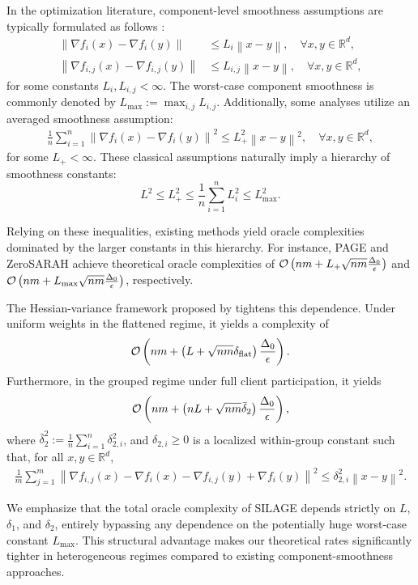 \documentclass{article}
\newcommand{\bb}{\mathbb}
\newcommand{\R}{\bb R}
\newcommand{\norm}[1]{\left\| #1 \right\|}
\newcommand{\sqn}[1]{\left\| #1 \right\|^2}
\newcommand{\cO}{{\cal O}}
\newcommand{\eqdef}{:=}
\newcommand{\rb}[1]{\left(#1\right)}
\theoremstyle{plain}
\newcommand{\algname}[1]{{\sf\scalefont{0.88}\color{mydarkgreen}#1}\xspace}
\def\algname#1{#1}%
\newcommand{\squeeze}{\textstyle}
\begin{document}
In the optimization literature, component-level smoothness assumptions are typically formulated as follows \citep{li21, PAGE-AB, li2021zerosarah, dasha23, zhao21}:
\begin{align}
    \squeeze
    \norm{\nabla f_i(x)-\nabla f_i(y)} &\leq L_i\norm{x-y}, \quad \forall x, y \in \R^d, \label{eq:smooth_i} \\
    \norm{\nabla f_{i,j}(x)-\nabla f_{i,j}(y)} &\leq L_{i,j}\norm{x-y}, \quad \forall x, y \in \R^d, \label{eq:smooth_ij}
\end{align}
for some constants $L_i, L_{i,j} < \infty$. The worst-case component smoothness is commonly denoted by $L_{\max} \eqdef \max_{i,j} L_{i,j}$. Additionally, some analyses utilize an averaged smoothness assumption:
\begin{align}
    \frac{1}{n} \sum_{i=1}^n\sqn{\nabla f_i(x)-\nabla f_i(y)} \leq L_{+}^2\sqn{x-y}, \quad \forall x, y \in \R^d,
    \label{eq:smooth_plus}
\end{align}
for some $L_{+} < \infty$. These classical assumptions naturally imply a hierarchy of smoothness constants: \[L^2 \le L_{+}^2 \leq \frac{1}{n} \sum_{i=1}^n L_i^2 \le L_{\max}^2.\]

Relying on these inequalities, existing methods yield oracle complexities dominated by the larger constants in this hierarchy. For instance, \algname{PAGE} \citep{li21} and \algname{ZeroSARAH} \citep{li2021zerosarah} achieve theoretical oracle complexities of $\cO\rb{nm + L_{+}\sqrt{nm}\frac{\Delta_0}{\epsilon}}$ and $\cO\rb{nm + L_{\max}\sqrt{nm}\frac{\Delta_0}{\epsilon}}$, respectively.

The Hessian-variance framework proposed by \citet{PAGE-AB} tightens this dependence. Under uniform weights in the flattened regime, it yields a complexity of \[\cO\rb{nm + \rb{L+\sqrt{nm}\delta_{\mathrm{flat}}}\frac{\Delta_0}{\epsilon}}.\] Furthermore, in the grouped regime under full client participation, it yields \[\cO\rb{nm+\rb{nL+\sqrt{nm}\bar\delta_2}\frac{\Delta_0}{\epsilon}},\] where $\bar\delta_2^2\eqdef \frac1n\sum_{i=1}^n\delta_{2,i}^2$, and $\delta_{2,i} \ge 0$ is a localized within-group constant such that, for all $x,y\in\R^d$,
\begin{align}
    \frac1m\sum_{j=1}^m
    \sqn{
    \nabla f_{i,j}(x)-\nabla f_i(x)
    -\nabla f_{i,j}(y)+\nabla f_i(y)}
    \leq
    \delta_{2,i}^2\sqn{x-y}.
    \label{eq:delta2i}
\end{align}

We emphasize that the total oracle complexity of \algname{SILAGE} depends strictly on $L$, $\delta_1$, and $\delta_2$, entirely bypassing any dependence on the potentially huge worst-case constant $L_{\max}$. This structural advantage makes our theoretical rates significantly tighter in heterogeneous regimes compared to existing component-smoothness approaches.
\end{document}
